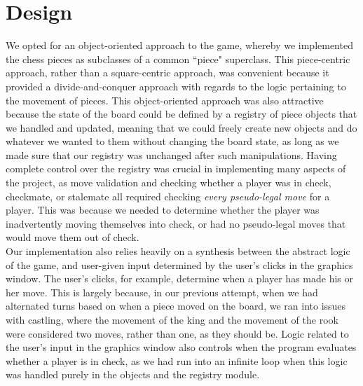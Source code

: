 \documentclass{article}
\begin{document}
\section{Design}
We opted for an object-oriented approach to the game, whereby we implemented the chess pieces as subclasses of a common ``piece" superclass. This piece-centric approach, rather than a square-centric approach, was convenient because it provided a divide-and-conquer approach with regards to the logic pertaining to the movement of pieces. This object-oriented approach was also attractive because the state of the board could be defined by a registry of piece objects that we handled and updated, meaning that we could freely create new objects and do whatever we wanted to them without changing the board state, as long as we made sure that our registry was unchanged after such manipulations. Having complete control over the registry was crucial in implementing many aspects of the project, as move validation and checking whether a player was in check, checkmate, or stalemate all required checking \textit{every pseudo-legal move} for a player. This was because we needed to determine whether the player was inadvertently moving themselves into check, or had no pseudo-legal moves that would move them out of check.
\\
Our implementation also relies heavily on a synthesis between the abstract logic of the game, and user-given input determined by the user's clicks in the graphics window. The user's clicks, for example, determine when a player has made his or her move. This is largely because, in our previous attempt, when we had alternated turns based on when a piece moved on the board, we ran into issues with castling, where the movement of the king and the movement of the rook were considered two moves, rather than one, as they should be. Logic related to the user's input in the graphics window also controls when the program evaluates whether a player is in check, as we had run into an infinite loop when this logic was handled purely in the objects and the registry module.
\end{document}
